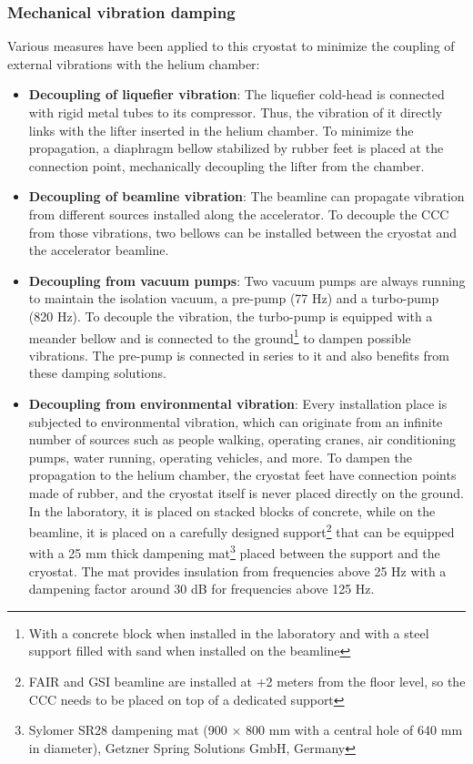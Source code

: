 \documentclass[12pt,a4paper]{report}
\begin{document}
       \subsubsection{Mechanical vibration damping}
       Various measures have been applied to this cryostat to minimize the coupling of external vibrations with the helium chamber:
       \begin{itemize}
       	\item \textbf{Decoupling of liquefier vibration}: The liquefier cold-head is connected with rigid metal tubes to its compressor. Thus, the vibration of it directly links with the lifter inserted in the helium chamber. To minimize the propagation, a diaphragm bellow stabilized by rubber feet is placed at the connection point, mechanically decoupling the lifter from the chamber.
       	\item \textbf{Decoupling of beamline vibration}: The beamline can propagate vibration from different sources installed along the accelerator. To decouple the CCC from those vibrations, two bellows can be installed between the cryostat and the accelerator beamline.
       	\item \textbf{Decoupling from vacuum pumps}: Two vacuum pumps are always running to maintain the isolation vacuum, a pre-pump (77 Hz) and a turbo-pump (820 Hz). To decouple the vibration, the turbo-pump is equipped with a meander bellow and is connected to the ground\footnote{With a concrete block when installed in the laboratory and with a steel support filled with sand when installed on the beamline} to dampen possible vibrations. The pre-pump is connected in series to it and also benefits from these damping solutions.
       	\item \textbf{Decoupling from environmental vibration}: Every installation place is subjected to environmental vibration, which can originate from an infinite number of sources such as people walking, operating cranes, air conditioning pumps, water running, operating vehicles, and more. To dampen the propagation to the helium chamber, the cryostat feet have connection points made of rubber, and the cryostat itself is never placed directly on the ground. In the laboratory, it is placed on stacked blocks of concrete, while on the beamline, it is placed on a carefully designed support\footnote{FAIR and GSI beamline are installed at +2 meters from the floor level, so the CCC needs to be placed on top of a dedicated support} that can be equipped with a 25 mm thick dampening mat\footnote{Sylomer SR28 dampening mat (900 $\times$ 800 mm with a central hole of 640 mm in diameter), Getzner Spring Solutions GmbH, Germany} placed between the support and the cryostat. The mat provides insulation from frequencies above 25 Hz with a dampening factor around 30 dB for frequencies above 125 Hz\cite{DavidThesis}.
       \end{itemize}       	
\end{document}
